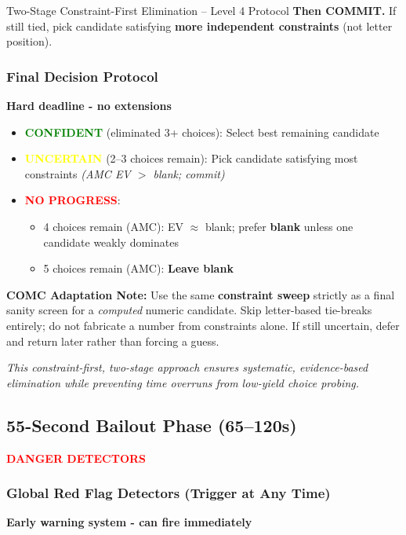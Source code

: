 \documentclass{article}
\begin{document}
\begin{classifybox}{Two-Stage Constraint-First Elimination -- Level 4 Protocol}
\textbf{Then COMMIT.} If still tied, pick candidate satisfying \textbf{more independent constraints} (not letter position).

\subsubsection{Final Decision Protocol}
{\footnotesize\textcolor{timegreen}{}}\quad\textbf{Hard deadline - no extensions}

\begin{itemize}[nosep]
\item \textcolor{green}{\textbf{CONFIDENT}} (eliminated 3+ choices): Select best remaining candidate
\item \textcolor{yellow}{\textbf{UNCERTAIN}} (2--3 choices remain): Pick candidate satisfying most constraints \textit{(AMC EV $>$ blank; commit)}
\item \textcolor{red}{\textbf{NO PROGRESS}}:
  \begin{itemize}[nosep]
  \item 4 choices remain (AMC): EV $\approx$ blank; prefer \textbf{blank} unless one candidate weakly dominates
  \item 5 choices remain (AMC): \textbf{Leave blank}
  \end{itemize}
\end{itemize}

\textbf{COMC Adaptation Note:} Use the same \textbf{constraint sweep} strictly as a final sanity screen for a \emph{computed} numeric candidate. Skip letter-based tie-breaks entirely; do not fabricate a number from constraints alone. If still uncertain, defer and return later rather than forcing a guess.

\textit{This constraint-first, two-stage approach ensures systematic, evidence-based elimination while preventing time overruns from low-yield choice probing.}
\end{classifybox}

\subsection{55-Second Bailout Phase (65--120s)}
{\footnotesize\textcolor{timegreen}{}}\quad\textbf{\textcolor{red}{DANGER DETECTORS}}\\
\hypertarget{redflags}{}

\subsubsection{Global Red Flag Detectors (Trigger at Any Time)}
{\footnotesize\textcolor{orange}{}}\quad\textbf{Early warning system - can fire immediately}
\end{document}
